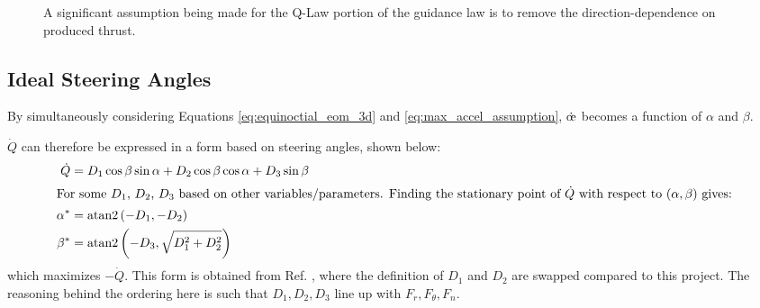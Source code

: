 \begin{figure}
    \centering
    \caption{A significant assumption being made for the Q-Law portion of the guidance law is to remove the direction-dependence on produced thrust.}
    \label{fig:thrust_curve}
\end{figure}

\subsection{Ideal Steering Angles}
By simultaneously considering Equations \ref{eq:equinoctial_eom_3d} and \ref{eq:max_accel_assumption}, $\dot{\moe}$ becomes a function of $\alpha$ and $\beta$.

$\dot{Q}$ can therefore be expressed in a form based on steering angles, shown below:
\begin{align}
    \dot{Q}  & = D_1 \cos \beta \sin \alpha + D_2 \cos \beta \cos \alpha + D_3 \sin \beta \label{eq:q_dot_angles_form} \\
    \intertext{For some $D_1$, $D_2$, $D_3$ based on other variables/parameters. Finding the stationary point of $\dot{Q}$ with respect to $(\alpha, \beta)$ gives:}
    \alpha^* & = \mathrm{atan2}\left(-D_1, -D_2\right) \label{eq:alpha_star}                                           \\
    \beta^*  & = \mathrm{atan2}\left(-D_3, \sqrt{D_1^2 + D_2^2}\right) \label{eq:beta_star}
\end{align}
which maximizes $-\dot{Q}$. This form is obtained from Ref. \cite{vargaperez2016}, where the definition of $D_1$ and $D_2$ are swapped compared to this project. The reasoning behind the ordering here is such that $D_1, D_2, D_3$ line up with $F_r, F_\theta, F_n$.

